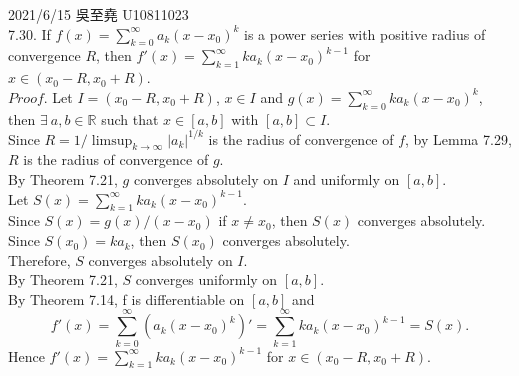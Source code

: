 \documentclass[12pt]{book}
\author{andersonwu2000}
\begin{document}
\begin{CJK}{UTF8}{bsmi}

\hfill 2021/6/15 吳至堯 U10811023 \\

7.30. If $f(x) = \sum_{k=0}^\infty a_k(x-x_0)^k$ is a power series with positive radius of convergence $R$, then $f'(x) = \sum_{k=1}^\infty k a_k(x-x_0)^{k-1}$ for $x\in(x_0-R, x_0+R)$. \\
$Proof$. Let $I=(x_0-R, x_0+R)$, $x\in I$ and $g(x) = \sum_{k=0}^\infty k a_k (x-x_0)^k$, then $\exists\ a, b\in\mathbb{R}$ such that $x\in[a, b]$ with $[a, b]\subset I$. \\
Since $R=1/\limsup_{k\rightarrow\infty}|a_k|^{1/k}$ is the radius of convergence of $f$, by Lemma 7.29, $R$ is the radius of convergence of $g$. \\
By Theorem 7.21, $g$ converges absolutely on $I$ and uniformly on $[a, b]$. \\
Let $S(x) = \sum_{k=1}^\infty k a_k (x-x_0)^{k-1}$. \\
Since $S(x) = g(x)/(x-x_0)$ if $x\ne x_0$, then $S(x)$ converges absolutely. \\
Since $S(x_0) = k a_k$, then $S(x_0)$ converges absolutely. \\
Therefore, $S$ converges absolutely on $I$. \\
By Theorem 7.21, $S$ converges uniformly on $[a, b]$. \\
By Theorem 7.14, f is differentiable on $[a, b]$ and
\[
    f'(x)
    = \sum_{k=0}^\infty (a_k(x-x_0)^k)'
    = \sum_{k=1}^\infty k a_k (x-x_0)^{k-1}
    = S(x).
\]
Hence $f'(x) = \sum_{k=1}^\infty k a_k(x-x_0)^{k-1}$ for $x\in(x_0-R, x_0+R)$. \\


\end{CJK}
\end{document}
